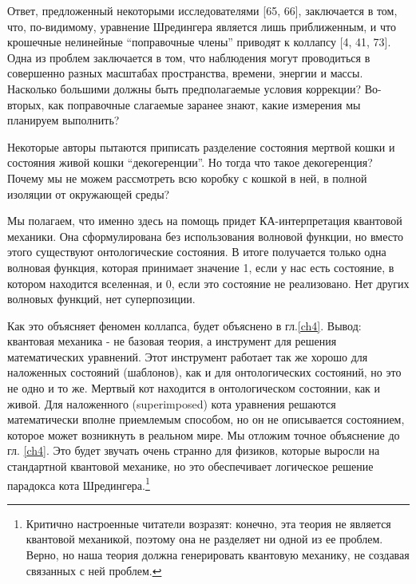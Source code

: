 \documentclass[main.tex]{subfiles}
\begin{document}
Ответ, предложенный некоторыми исследователями [65, 66], заключается в том, что, по-видимому, уравнение Шредингера является лишь приближенным, и что крошечные нелинейные ``поправочные члены'' приводят к коллапсу [4, 41, 73]. Одна из проблем заключается в том, что наблюдения могут проводиться в совершенно разных масштабах пространства, времени, энергии и массы. Насколько большими должны быть предполагаемые условия коррекции? Во-вторых, как поправочные слагаемые заранее знают, какие измерения мы планируем выполнить?

Некоторые авторы пытаются приписать разделение состояния мертвой кошки и состояния живой кошки ``декогеренции''. Но тогда что такое декогеренция? Почему мы не можем рассмотреть всю коробку с кошкой в ней, в полной изоляции от окружающей среды?

Мы полагаем, что именно здесь на помощь придет КА-интерпретация квантовой механики. Она сформулирована без использования волновой функции, но вместо этого существуют онтологические состояния. В итоге получается только одна волновая функция, которая принимает значение 1, если у нас есть состояние, в котором находится вселенная, и 0, если это состояние не реализовано. Нет других волновых функций, нет суперпозиции.

Как это объясняет феномен коллапса, будет объяснено в гл.\ref{ch4}. Вывод: квантовая механика - не базовая теория, а инструмент для решения математических уравнений. Этот инструмент работает так же хорошо для наложенных состояний (шаблонов), как и для онтологических состояний, но это не одно и то же. Мертвый кот находится в онтологическом состоянии, как и живой. Для наложенного (superimposed) кота уравнения решаются математически вполне приемлемым способом, но он не описывается состоянием, которое может возникнуть в реальном мире. Мы отложим точное объяснение до гл. \ref{ch4}. Это будет звучать очень странно для физиков, которые выросли на стандартной квантовой механике, но это обеспечивает логическое решение парадокса кота Шредингера.\footnote{Критично настроенные читатели возразят: конечно, эта теория не является квантовой механикой, поэтому она не разделяет ни одной из ее проблем. Верно, но наша теория должна генерировать квантовую механику, не создавая связанных с ней проблем.}
\end{document}
